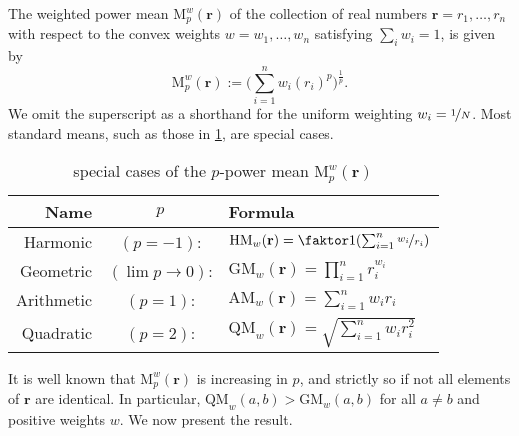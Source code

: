 \documentclass[twoside]{article}
\theoremstyle{plain}
\theoremstyle{definition}
\begin{document}
\begin{defn}%
	The weighted power mean $\mathrm M^w_p(\mathbf r)$ of the collection of real numbers $\mathbf r = r_1, \ldots, r_n$ with respect to the convex weights $w = w_1, \ldots, w_n$ satisfying $\sum_iw_i = 1$, is given by
	\[ \mathrm M^w_p(\mathbf r) := \Big(\sum_{i=1}^n w_i (r_i)^p \Big)^{\frac1p}.\]
	We omit the superscript as a shorthand for the uniform weighting $w_i = \nicefrac{1}{N}$.
	Most standard means, such as those in \cref{tab:power-means}, are special cases.
\end{defn}

\begin{table}
\centering
\renewcommand{\arraystretch}{1.5} %
\begin{tabular}{rcl}
	\textbf{Name} & $p$ & \textbf{Formula}\\\hline
	Harmonic&$(p=-1)$:& $\mathrm{HM}_w(\mathbf r) = \faktor1{\left(\sum_{i=1}^n \nicefrac{w_i}{r_i}\right)}$ \\
	Geometric&$(\lim {p\to 0})$:& $\mathrm{GM}_w(\mathbf r) = \prod_{i=1}^n r_i^{w_i}$ \\
	Arithmetic&$(p=1)$:& $\mathrm{AM}_w(\mathbf r) = \sum_{i=1}^n w_i r_i$ \\
	Quadratic&$(p=2)$:& $\mathrm{QM}_w(\mathbf r) = \sqrt{\textstyle\sum_{i=1}^n w_i r_i^2}$\\\hline
	\end{tabular}
	\caption{special cases of the $p$-power mean $\mathrm M_p^w(\mathbf r)$}
	\label{tab:power-means}
\end{table}

It is well known that $\mathrm M_p^w(\mathbf r)$ is increasing in $p$, and strictly so if not all elements of $\mathbf r$ are identical. In particular, $\mathrm{QM}_w(a,b) > \mathrm{GM}_w(a,b)$ for all $a \ne b$ and positive weights $w$. We now present the result.
\end{document}
